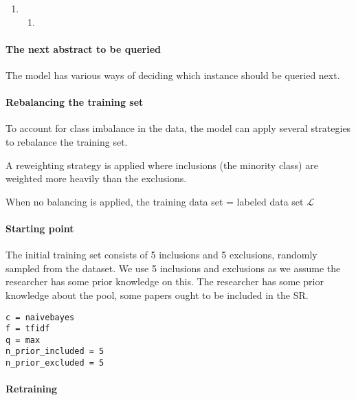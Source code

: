 \documentclass[
]{article}
\providecommand{\tightlist}{%
  \setlength{\itemsep}{0pt}\setlength{\parskip}{0pt}}
\begin{document}
\begin{enumerate}
\def\labelenumi{(\Alph{enumi})}
\setcounter{enumi}{19}
\item
  \begin{enumerate}
  \def\labelenumii{(\Alph{enumii})}
  \setcounter{enumii}{3}
  \tightlist
  \item
  \end{enumerate}
\end{enumerate}

\hypertarget{the-next-abstract-to-be-queried}{%
\paragraph{The next abstract to be
queried}\label{the-next-abstract-to-be-queried}}

The model has various ways of deciding which instance should be queried
next.

\hypertarget{rebalancing-the-training-set}{%
\paragraph{Rebalancing the training
set}\label{rebalancing-the-training-set}}

To account for class imbalance in the data, the model can apply several
strategies to rebalance the training set.

A reweighting strategy is applied where inclusions (the minority class)
are weighted more heavily than the exclusions.

When no balancing is applied, the training data set = labeled data set
\(\mathcal{L}\)

\hypertarget{starting-point}{%
\paragraph{Starting point}\label{starting-point}}

The initial training set consists of 5 inclusions and 5 exclusions,
randomly sampled from the dataset. We use 5 inclusions and exclusions as
we assume the researcher has some prior knowledge on this. The
researcher has some prior knowledge about the pool, some papers ought to
be included in the SR.

\begin{verbatim}
c = naivebayes
f = tfidf
q = max
n_prior_included = 5
n_prior_excluded = 5
\end{verbatim}

\hypertarget{retraining}{%
\paragraph{Retraining}\label{retraining}}
\end{document}
